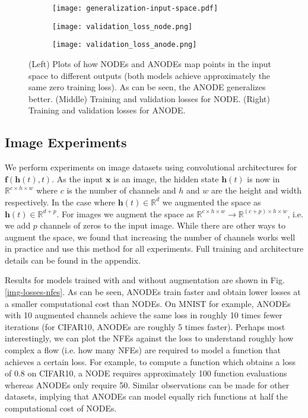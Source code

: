 \documentclass{article}
\begin{document}
\begin{figure}[b]
\vspace{-5pt}
\centering
\begin{subfigure}[t]{0.4\linewidth}
\centering
\texttt{[image: generalization-input-space.pdf]}
\end{subfigure}
\begin{subfigure}[t]{0.29\linewidth}
\centering
\texttt{[image: validation\_loss\_node.png]}
\end{subfigure}
\begin{subfigure}[t]{0.29\linewidth}
\centering
\texttt{[image: validation\_loss\_anode.png]}
\end{subfigure}
\caption{(Left) Plots of how NODEs and ANODEs map points in the input space to different outputs (both models achieve approximately the same zero training loss). As can be seen, the ANODE generalizes better. (Middle) Training and validation losses for NODE. (Right) Training and validation losses for ANODE.}
\label{generalization-fig}
\end{figure}
\vspace{-5pt}


\subsection{Image Experiments} \label{image-exp-section}
We perform experiments on image datasets using convolutional architectures for $\mathbf{f}(\mathbf{h}(t), t)$. As the input $\mathbf{x}$ is an image, the hidden state $\mathbf{h}(t)$ is now in $\mathbb{R}^{c \times h \times w}$ where $c$ is the number of channels and $h$ and $w$ are the height and width respectively. In the case where $\mathbf{h}(t) \in \mathbb{R}^{d}$ we augmented the space as $\mathbf{h}(t) \in \mathbb{R}^{d + p}$. For images we augment the space as $\mathbb{R}^{c \times h \times w} \to \mathbb{R}^{(c + p) \times h \times w}$, i.e. we add $p$ channels of zeros to the input image. While there are other ways to augment the space, we found that increasing the number of channels works well in practice and use this method for all experiments. Full training and architecture details can be found in the appendix.



Results for models trained with and without augmentation are shown in Fig. \ref{img-losses-nfes}. As can be seen, ANODEs train faster and obtain lower losses at a smaller computational cost than NODEs. On MNIST for example, ANODEs with 10 augmented channels achieve the same loss in roughly 10 times fewer iterations (for CIFAR10, ANODEs are roughly 5 times faster). Perhaps most interestingly, we can plot the NFEs against the loss to understand roughly how complex a flow (i.e. how many NFEs) are required to model a function that achieves a certain loss. For example, to compute a function which obtains a loss of 0.8 on CIFAR10, a NODE requires approximately 100 function evaluations whereas ANODEs only require 50. Similar observations can be made for other datasets, implying that ANODEs can model equally rich functions at half the computational cost of NODEs.
\end{document}
